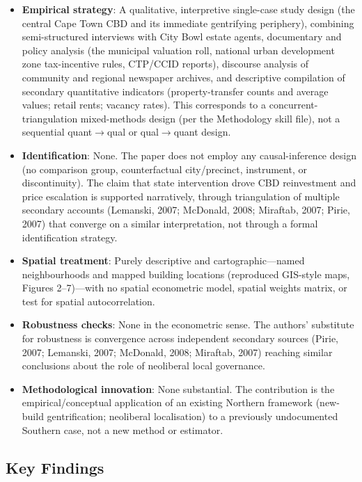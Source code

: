 \begin{itemize}
  \item \textbf{Empirical strategy}: A qualitative, interpretive single-case study design (the central Cape Town CBD and its immediate gentrifying periphery), combining semi-structured interviews with City Bowl estate agents, documentary and policy analysis (the municipal valuation roll, national urban development zone tax-incentive rules, CTP/CCID reports), discourse analysis of community and regional newspaper archives, and descriptive compilation of secondary quantitative indicators (property-transfer counts and average values; retail rents; vacancy rates). This corresponds to a concurrent-triangulation mixed-methods design (per the Methodology skill file), not a sequential quant$\to$qual or qual$\to$quant design.
  \item \textbf{Identification}: None. The paper does not employ any causal-inference design (no comparison group, counterfactual city/precinct, instrument, or discontinuity). The claim that state intervention drove CBD reinvestment and price escalation is supported narratively, through triangulation of multiple secondary accounts (Lemanski, 2007; McDonald, 2008; Miraftab, 2007; Pirie, 2007) that converge on a similar interpretation, not through a formal identification strategy.
  \item \textbf{Spatial treatment}: Purely descriptive and cartographic---named neighbourhoods and mapped building locations (reproduced GIS-style maps, Figures 2--7)---with no spatial econometric model, spatial weights matrix, or test for spatial autocorrelation.
  \item \textbf{Robustness checks}: None in the econometric sense. The authors' substitute for robustness is convergence across independent secondary sources (Pirie, 2007; Lemanski, 2007; McDonald, 2008; Miraftab, 2007) reaching similar conclusions about the role of neoliberal local governance.
  \item \textbf{Methodological innovation}: None substantial. The contribution is the empirical/conceptual application of an existing Northern framework (new-build gentrification; neoliberal localisation) to a previously undocumented Southern case, not a new method or estimator.
\end{itemize}

\subsection*{Key Findings}

